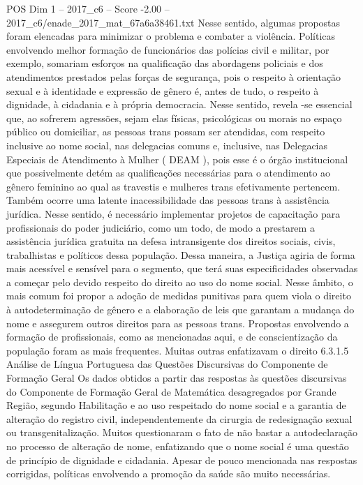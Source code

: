 \begin{textsample}{POS Dim 1 – 2017\_c6 – Score -2.00 – 2017\_c6/enade\_2017\_mat\_67a6a38461.txt}
Nesse sentido, algumas propostas foram elencadas para minimizar o problema e combater a violência.
Políticas envolvendo melhor formação de funcionários das polícias civil e militar, por exemplo, somariam esforços na qualificação das abordagens policiais e dos atendimentos prestados pelas forças de segurança, pois o respeito à orientação sexual e à identidade e expressão de gênero é, antes de tudo, o respeito à dignidade, à cidadania e à própria democracia.
Nesse sentido, revela -se essencial que, ao sofrerem agressões, sejam elas físicas, psicológicas ou morais no espaço público ou domiciliar, as pessoas trans possam ser atendidas, com respeito inclusive ao nome social, nas delegacias comuns e, inclusive, nas Delegacias Especiais de Atendimento à Mulher ( DEAM ), pois esse é o órgão institucional que possivelmente detém as qualificações necessárias para o atendimento ao gênero feminino ao qual as travestis e mulheres trans efetivamente pertencem.
Também ocorre uma latente inacessibilidade das pessoas trans à assistência jurídica.
Nesse sentido, é necessário implementar projetos de capacitação para profissionais do poder judiciário, como um todo, de modo a prestarem a assistência jurídica gratuita na defesa intransigente dos direitos sociais, civis, trabalhistas e políticos dessa população.
Dessa maneira, a Justiça agiria de forma mais acessível e sensível para o segmento, que terá suas especificidades observadas a começar pelo devido respeito do direito ao uso do nome social.
Nesse âmbito, o mais comum foi propor a adoção de medidas punitivas para quem viola o direito à autodeterminação de gênero e a elaboração de leis que garantam a mudança do nome e assegurem outros direitos para as pessoas trans.
Propostas envolvendo a formação de profissionais, como as mencionadas aqui, e de conscientização da população foram as mais frequentes.
Muitas outras enfatizavam o direito 6.3.1.5 Análise de Língua Portuguesa das Questões Discursivas do Componente de Formação Geral Os dados obtidos a partir das respostas às questões discursivas do Componente de Formação Geral de Matemática desagregados por Grande Região, segundo Habilitação e ao uso respeitado do nome social e a garantia de alteração do registro civil, independentemente da cirurgia de redesignação sexual ou transgenitalização.
Muitos questionaram o fato de não bastar a autodeclaração no processo de alteração de nome, enfatizando que o nome social é uma questão de princípio de dignidade e cidadania.
Apesar de pouco mencionada nas respostas corrigidas, políticas envolvendo a promoção da saúde são muito necessárias.

\end{textsample}
